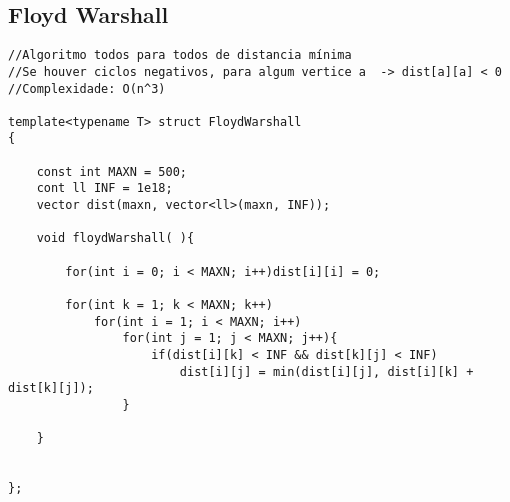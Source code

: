 \documentclass[11pt, a4paper, twoside]{article}
\begin{document}
\subsection{Floyd Warshall}
\begin{verbatim}
//Algoritmo todos para todos de distancia mínima
//Se houver ciclos negativos, para algum vertice a  -> dist[a][a] < 0
//Complexidade: O(n^3)

template<typename T> struct FloydWarshall
{   
    
    const int MAXN = 500;
    cont ll INF = 1e18;
    vector dist(maxn, vector<ll>(maxn, INF));
    
    void floydWarshall( ){
    
        for(int i = 0; i < MAXN; i++)dist[i][i] = 0;
    
        for(int k = 1; k < MAXN; k++)
            for(int i = 1; i < MAXN; i++)
                for(int j = 1; j < MAXN; j++){
                    if(dist[i][k] < INF && dist[k][j] < INF)
                        dist[i][j] = min(dist[i][j], dist[i][k] + dist[k][j]);
                }
                
    }
    
    
};
\end{verbatim}
\end{document}
